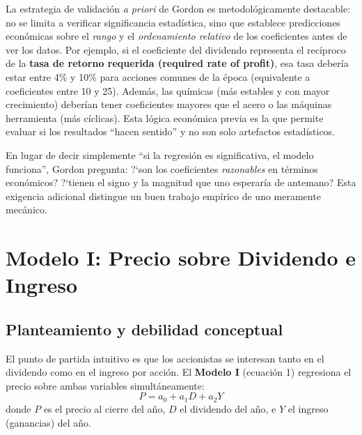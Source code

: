\documentclass[12pt]{article}
\begin{document}
\begin{explicacion}
La estrategia de validaci\'on \textit{a priori} de Gordon es metodol\'ogicamente destacable: no se limita a verificar significancia estad\'istica, sino que establece predicciones econ\'omicas sobre el \textit{rango} y el \textit{ordenamiento relativo} de los coeficientes antes de ver los datos. Por ejemplo, si el coeficiente del dividendo representa el rec\'iproco de la \textbf{tasa de retorno requerida (required rate of profit)}, esa tasa deber\'ia estar entre 4\% y 10\% para acciones comunes de la \'epoca (equivalente a coeficientes entre 10 y 25). Adem\'as, las qu\'imicas (m\'as estables y con mayor crecimiento) deber\'ian tener coeficientes mayores que el acero o las m\'aquinas herramienta (m\'as c\'iclicas). Esta l\'ogica econ\'omica previa es la que permite evaluar si los resultados ``hacen sentido'' y no son solo artefactos estad\'isticos.
\end{explicacion}

\begin{intuicion}
En lugar de decir simplemente ``si la regresi\'on es significativa, el modelo funciona'', Gordon pregunta: ?`son los coeficientes \textit{razonables} en t\'erminos econ\'omicos? ?`tienen el signo y la magnitud que uno esperaría de antemano? Esta exigencia adicional distingue un buen trabajo empírico de uno meramente mec\'anico.
\end{intuicion}

\section{Modelo I: Precio sobre Dividendo e Ingreso}

\subsection{Planteamiento y debilidad conceptual}

El punto de partida intuitivo es que los accionistas se interesan tanto en el dividendo como en el ingreso por acci\'on. El \textbf{Modelo I} (ecuaci\'on 1) regresiona el precio sobre ambas variables simult\'aneamente:
\[
P = a_0 + a_1 D + a_2 Y
\]
donde $P$ es el precio al cierre del a\~no, $D$ el dividendo del a\~no, e $Y$ el ingreso (ganancias) del a\~no.
\end{document}
